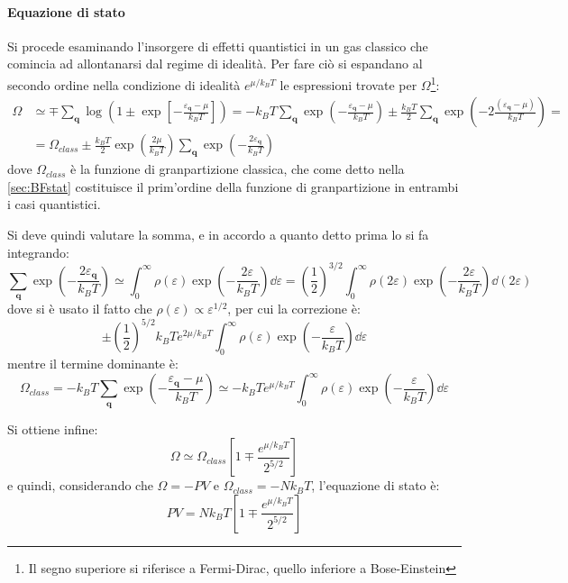 \paragraph{Equazione di stato} Si procede esaminando l'insorgere di effetti quantistici in un gas classico che comincia ad allontanarsi dal regime di idealità. Per fare ciò si espandano al secondo ordine nella condizione di idealità $e^{\mu/k_B T}$ le espressioni trovate per $\Omega$\footnote{Il segno superiore si riferisce a Fermi-Dirac, quello inferiore a Bose-Einstein}:
\begin{align*}
	\Omega &\simeq \mp \sum_{\textbf{q}} \log(1 \pm \exp[-\frac{\varepsilon_{\textbf{q}} - \mu}{k_B T}]) = -k_B T \sum_{\textbf{q}} \exp(-\frac{\varepsilon_{\textbf{q}} - \mu}{k_B T}) \pm \frac{k_B T}{2} \sum_{\textbf{q}} \exp(-2\frac{(\varepsilon_{\textbf{q}} - \mu)}{k_B T}) = \\
	&= \Omega_{class} \pm \frac{k_B T}{2} \exp(\frac{2\mu}{k_B T})\sum_{\textbf{q}} \exp(-\frac{2\varepsilon_{\textbf{q}} }{k_B T})
\end{align*}
dove $\Omega_{class}$ è la funzione di granpartizione classica, che come detto nella \cref{sec:BFstat} costituisce il prim'ordine della funzione di granpartizione in entrambi i casi quantistici.

Si deve quindi valutare la somma, e in accordo a quanto detto prima lo si fa integrando:
\begin{equation*}
\sum_{\textbf{q}} \exp(-\frac{2\varepsilon_{\textbf{q}} }{k_B T}) \simeq \int_0^{\infty} \rho(\varepsilon) \exp(-\frac{2\varepsilon }{k_B T}) \dd \varepsilon = \left(\frac{1}{2}\right)^{3/2 } \int_0^{\infty} \rho(2\varepsilon) \exp(-\frac{2\varepsilon }{k_B T}) \dd (2\varepsilon)
\end{equation*}
dove si è usato il fatto che $\rho(\varepsilon) \propto \varepsilon^{1/2}$, per cui la correzione è:
\begin{equation*}
\pm \left(\frac{1}{2}\right)^{5/2}k_B T e^{2\mu/k_B T}  \int_0^{\infty} \rho(\varepsilon) \exp(-\frac{\varepsilon }{k_B T}) \dd \varepsilon
\end{equation*}
mentre il termine dominante è:
\begin{equation*}
\Omega_{class} = -k_B T \sum_{\textbf{q}} \exp(-\frac{\varepsilon_{\textbf{q}} - \mu}{k_B T}) \simeq - k_B T e^{\mu/k_B T}  \int_0^{\infty} \rho(\varepsilon) \exp(-\frac{\varepsilon }{k_B T}) \dd \varepsilon
\end{equation*}

Si ottiene infine:
\begin{equation*}
	\Omega \simeq \Omega_{class}\left[1 \mp \frac{e^{\mu/k_B T}}{2^{5/2}}\right]
\end{equation*}
e quindi, considerando che $\Omega = - PV$ e $\Omega_{class} = - N k_B T$, l'equazione di stato è:
\begin{equation*}
	PV = N k_B T \left[1 \mp \frac{e^{\mu/k_B T}}{2^{5/2}}\right]
\end{equation*}

